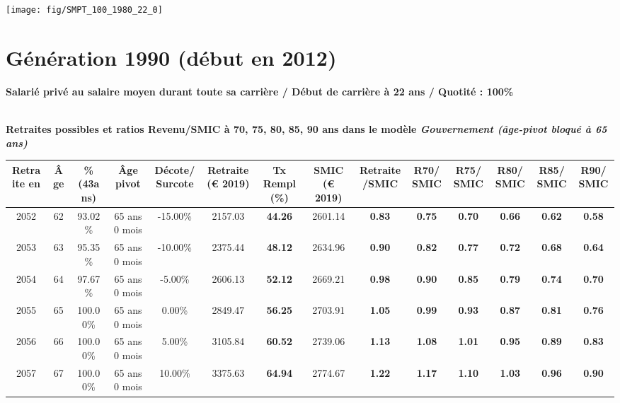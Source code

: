  \vspace{0.1cm} 

 {\hspace{-2.2cm}\texttt{[image: fig/SMPT\_100\_1980\_22\_0]}} 

\newpage 
 
\section{Génération 1990 (début en 2012)\label{SMPT_100_1990_22_0}} 
 
{\bf \noindent Salarié privé au salaire moyen durant toute sa carrière / Début de carrière à 22 ans / Quotité : 100\%}  ~ 

 ~\\{\bf \noindent Retraites possibles et ratios Revenu/SMIC à 70, 75, 80, 85, 90 ans dans le modèle \emph{Gouvernement (âge-pivot bloqué à 65 ans)}}  
 
\begin{adjustbox}{max width=\textwidth} 
\begin{tabular}[htb]{|c|c||c|c|c||c|c||c|c||c|c|c|c|c|} 
\hline 
 Retraite en &  Âge &  \%(43ans) &  Âge pivot &  Décote/Surcote &  Retraite (\euro{} 2019) &  Tx Rempl(\%) &  SMIC (\euro{} 2019) &  Retraite/SMIC &  R70/SMIC &  R75/SMIC &  R80/SMIC &  R85/SMIC &  R90/SMIC \\ 
\hline \hline 
 2052 &  62 &  93.02\% &  65 ans 0 mois &  -15.00\% &  2157.03 &  {\bf 44.26} &  2601.14 &  {\bf {\color{red} 0.83}} &  {\bf {\color{red} 0.75}} &  {\bf {\color{red} 0.70}} &  {\bf {\color{red} 0.66}} &  {\bf {\color{red} 0.62}} &  {\bf {\color{red} 0.58}} \\ 
\hline 
 2053 &  63 &  95.35\% &  65 ans 0 mois &  -10.00\% &  2375.44 &  {\bf 48.12} &  2634.96 &  {\bf {\color{red} 0.90}} &  {\bf {\color{red} 0.82}} &  {\bf {\color{red} 0.77}} &  {\bf {\color{red} 0.72}} &  {\bf {\color{red} 0.68}} &  {\bf {\color{red} 0.64}} \\ 
\hline 
 2054 &  64 &  97.67\% &  65 ans 0 mois &  -5.00\% &  2606.13 &  {\bf 52.12} &  2669.21 &  {\bf {\color{red} 0.98}} &  {\bf {\color{red} 0.90}} &  {\bf {\color{red} 0.85}} &  {\bf {\color{red} 0.79}} &  {\bf {\color{red} 0.74}} &  {\bf {\color{red} 0.70}} \\ 
\hline 
 2055 &  65 &  100.00\% &  65 ans 0 mois &  0.00\% &  2849.47 &  {\bf 56.25} &  2703.91 &  {\bf 1.05} &  {\bf {\color{red} 0.99}} &  {\bf {\color{red} 0.93}} &  {\bf {\color{red} 0.87}} &  {\bf {\color{red} 0.81}} &  {\bf {\color{red} 0.76}} \\ 
\hline 
 2056 &  66 &  100.00\% &  65 ans 0 mois &  5.00\% &  3105.84 &  {\bf 60.52} &  2739.06 &  {\bf 1.13} &  {\bf 1.08} &  {\bf 1.01} &  {\bf {\color{red} 0.95}} &  {\bf {\color{red} 0.89}} &  {\bf {\color{red} 0.83}} \\ 
\hline 
 2057 &  67 &  100.00\% &  65 ans 0 mois &  10.00\% &  3375.63 &  {\bf 64.94} &  2774.67 &  {\bf 1.22} &  {\bf 1.17} &  {\bf 1.10} &  {\bf 1.03} &  {\bf {\color{red} 0.96}} &  {\bf {\color{red} 0.90}} \\ 
\hline 
\hline 
\end{tabular} 
\end{adjustbox} 
 
